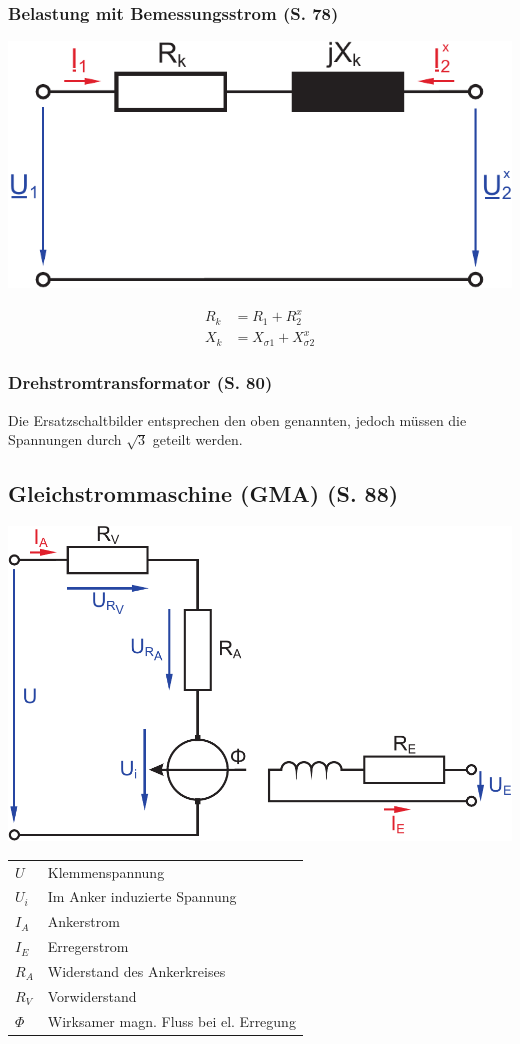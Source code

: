 \documentclass[a4paper,twocolumn,10pt]{article}
\begin{document}
\subsubsection{Belastung mit Bemessungsstrom (S. 78)}
\begin{center}
\includegraphics[width=0.6\columnwidth]{Grafiken/Trafo_BS_ESB}
\end{center}
\begin{equation*}
\begin{split}
R_k&=R_1+R_2^x\\
X_k&=X_{\sigma 1}+X_{\sigma 2}^x
\end{split}
\end{equation*}

\subsubsection{Drehstromtransformator (S. 80)}
Die Ersatzschaltbilder entsprechen den oben genannten, jedoch müssen die Spannungen durch $\sqrt{3}$ geteilt werden.

\newpage

\subsection{Gleichstrommaschine (GMA) (S. 88)}
\begin{center}
\includegraphics[width=0.95\columnwidth]{Grafiken/Gleichstrommaschine}
\end{center}
\begin{tabular}{ll}
$U$ & Klemmenspannung\\
$U_i$ & Im Anker induzierte Spannung\\
$I_A$ & Ankerstrom\\
$I_E$ & Erregerstrom\\
$R_A$ & Widerstand des Ankerkreises\\
$R_V$ & Vorwiderstand\\
$\Phi$ & Wirksamer magn. Fluss bei el. Erregung
\end{tabular}
\end{document}
